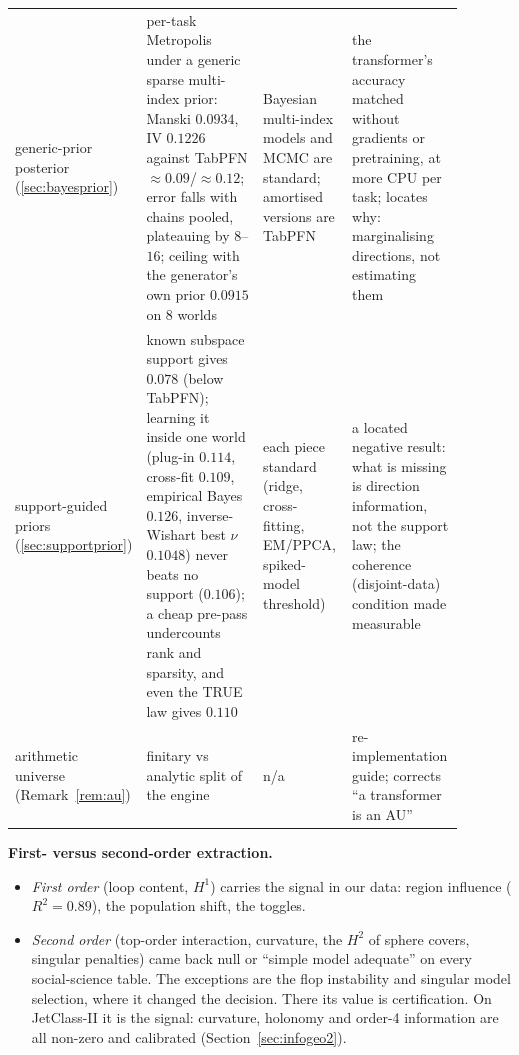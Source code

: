 \documentclass[11pt]{article}
\theoremstyle{definition}
\theoremstyle{remark}
\newcommand{\bayesM}{0.0934}\newcommand{\bayesIV}{0.1226}\newcommand{\bayesCH}{16}\newcommand{\bayesWM}{31}\newcommand{\bayesWIV}{33}
\begin{document}
{\begin{longtable}{>{\raggedright\arraybackslash}p{0.15\linewidth}>{\raggedright\arraybackslash}p{0.29\linewidth}>{\raggedright\arraybackslash}p{0.2\linewidth}>{\raggedright\arraybackslash}p{0.25\linewidth}}
generic-prior posterior (\ref{sec:bayesprior}) & per-task Metropolis under a generic sparse multi-index prior: Manski $\bayesM$, IV $\bayesIV$ against TabPFN $\approx0.09$/$\approx0.12$; error falls with chains pooled, plateauing by $8$--$16$; ceiling with the generator's own prior $0.0915$ on $8$ worlds & Bayesian multi-index models and MCMC are standard; amortised versions are TabPFN & the transformer's accuracy matched without gradients or pretraining, at more CPU per task; locates why: marginalising directions, not estimating them\\
support-guided priors (\ref{sec:supportprior}) & known subspace support gives $0.078$ (below TabPFN); learning it inside one world (plug-in $0.114$, cross-fit $0.109$, empirical Bayes $0.126$, inverse-Wishart best $\nu$ $0.1048$) never beats no support ($0.106$); a cheap pre-pass undercounts rank and sparsity, and even the TRUE law gives $0.110$ & each piece standard (ridge, cross-fitting, EM/PPCA, spiked-model threshold) & a located negative result: what is missing is direction information, not the support law; the coherence (disjoint-data) condition made measurable\\
arithmetic universe (Remark~\ref{rem:au}) & finitary vs analytic split of the engine & n/a & re-implementation guide; corrects ``a transformer is an AU''\\
\end{longtable}}

\textbf{First- versus second-order extraction.}
\begin{itemize}
  \item \emph{First order} (loop content, $H^1$) carries the signal in our data: region influence ($R^2=0.89$), the population shift, the toggles.
  \item \emph{Second order} (top-order interaction, curvature, the $H^2$ of sphere covers, singular penalties) came back null or ``simple model adequate'' on every social-science table. The exceptions are the flop instability and singular model selection, where it changed the decision. There its value is certification. On JetClass-II it is the signal: curvature, holonomy and order-4 information are all non-zero and calibrated (Section~\ref{sec:infogeo2}).
\end{itemize}
\end{document}
